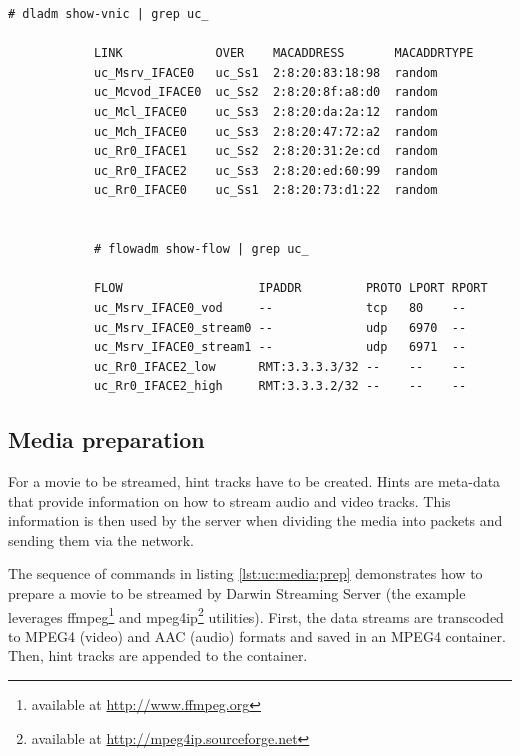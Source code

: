\documentclass[11pt]{book}
\begin{document}
        \noindent
        \begin{minipage}{\textwidth}
          \begin{lstlisting}[caption={Virtual interfaces and flows created on top of them},label={lst:uc:xbow:vnic}]
            # dladm show-vnic | grep uc_

            LINK             OVER    MACADDRESS       MACADDRTYPE
            uc_Msrv_IFACE0   uc_Ss1  2:8:20:83:18:98  random     
            uc_Mcvod_IFACE0  uc_Ss2  2:8:20:8f:a8:d0  random     
            uc_Mcl_IFACE0    uc_Ss3  2:8:20:da:2a:12  random     
            uc_Mch_IFACE0    uc_Ss3  2:8:20:47:72:a2  random     
            uc_Rr0_IFACE1    uc_Ss2  2:8:20:31:2e:cd  random     
            uc_Rr0_IFACE2    uc_Ss3  2:8:20:ed:60:99  random     
            uc_Rr0_IFACE0    uc_Ss1  2:8:20:73:d1:22  random     


            # flowadm show-flow | grep uc_

            FLOW                   IPADDR         PROTO LPORT RPORT
            uc_Msrv_IFACE0_vod     --             tcp   80    --   
            uc_Msrv_IFACE0_stream0 --             udp   6970  --   
            uc_Msrv_IFACE0_stream1 --             udp   6971  --   
            uc_Rr0_IFACE2_low      RMT:3.3.3.3/32 --    --    --   
            uc_Rr0_IFACE2_high     RMT:3.3.3.2/32 --    --    --   
          \end{lstlisting}
        \end{minipage}


      \subsection{Media preparation}
      \label{sub:}

        For a movie to be streamed, hint tracks have to be created. Hints are meta-data that provide information on how
        to stream audio and video tracks. This information is then used by the server when dividing the media into
        packets and sending them via the network.

        The sequence of commands in listing \ref{lst:uc:media:prep} demonstrates how to prepare a movie to be streamed
        by Darwin Streaming Server (the example leverages ffmpeg\footnote{available at \url{http://www.ffmpeg.org}} and
        mpeg4ip\footnote{available at \url{http://mpeg4ip.sourceforge.net}} utilities). First, the data streams are
        transcoded to MPEG4 (video) and AAC (audio) formats and saved in an MPEG4 container. Then, hint tracks are
        appended to the container. \\
\end{document}
